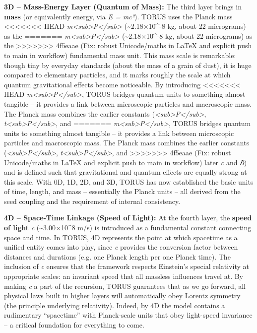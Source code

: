 \documentclass[]{article}
\begin{document}
\textbf{3D -- Mass-Energy Layer (Quantum of Mass):} The third layer
brings in \textbf{mass} (or equivalently energy, via \emph{E = mc²}).
TORUS uses the Planck mass
<<<<<<< HEAD
\emph{m\textless sub\textgreater P\textless/sub\textgreater{}}
(\textasciitilde2.18×10\^{}-8 kg, about 22 micrograms) as the
=======
\emph{m\textless{}sub\textgreater{}P\textless{}/sub\textgreater{}}
(\textasciitilde{}2.18×10\^{}-8 kg, about 22 micrograms) as the
>>>>>>> 4f5eaae (Fix: robust Unicode/maths in LaTeX and explicit push to main in workflow)
fundamental mass unit. This mass scale is remarkable: though tiny by
everyday standards (about the mass of a grain of dust), it is huge
compared to elementary particles, and it marks roughly the scale at
which quantum gravitational effects become noticeable. By introducing
<<<<<<< HEAD
\emph{m\textless sub\textgreater P\textless/sub\textgreater{}}, TORUS
bridges quantum units to something almost tangible -- it provides a link
between microscopic particles and macroscopic mass. The Planck mass
combines the earlier constants
(\emph{\ell\textless sub\textgreater P\textless/sub\textgreater{}},
\emph{t\textless sub\textgreater P\textless/sub\textgreater{}}, and
=======
\emph{m\textless{}sub\textgreater{}P\textless{}/sub\textgreater{}},
TORUS bridges quantum units to something almost tangible -- it provides
a link between microscopic particles and macroscopic mass. The Planck
mass combines the earlier constants
(\emph{\ell\textless{}sub\textgreater{}P\textless{}/sub\textgreater{}},
\emph{t\textless{}sub\textgreater{}P\textless{}/sub\textgreater{}}, and
>>>>>>> 4f5eaae (Fix: robust Unicode/maths in LaTeX and explicit push to main in workflow)
later \emph{c} and \emph{ℏ}) and is defined such that gravitational and
quantum effects are equally strong at this scale. With 0D, 1D, 2D, and
3D, TORUS has now established the basic units of time, length, and mass
-- essentially the Planck units -- all derived from the seed coupling
and the requirement of internal consistency.

\textbf{4D -- Space-Time Linkage (Speed of Light):} At the fourth layer,
the \textbf{speed of light} \emph{c} (\textasciitilde{}3.00×10\^{}8 m/s)
is introduced as a fundamental constant connecting space and time. In
TORUS, 4D represents the point at which spacetime as a unified entity
comes into play, since \emph{c} provides the conversion factor between
distances and durations (e.g. one Planck length per one Planck time).
The inclusion of \emph{c} ensures that the framework respects Einstein's
special relativity at appropriate scales: an invariant speed that all
massless influences travel at. By making \emph{c} a part of the
recursion, TORUS guarantees that as we go forward, all physical laws
built in higher layers will automatically obey Lorentz symmetry (the
principle underlying relativity). Indeed, by 4D the model contains a
rudimentary ``spacetime'' with Planck-scale units that obey light-speed
invariance -- a critical foundation for everything to come.
\end{document}
